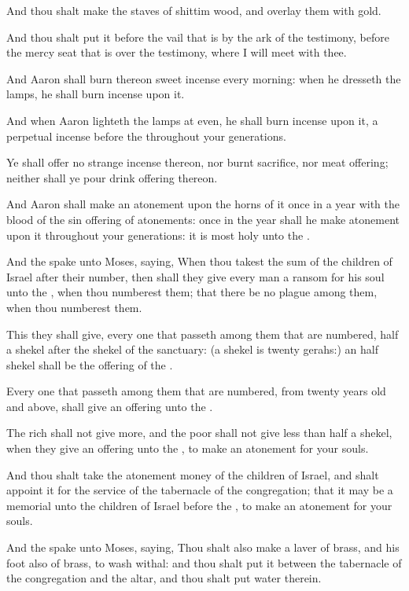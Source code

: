 \verse And thou shalt make the staves of shittim wood, and overlay them
with gold.

\verse And thou shalt put it before the vail that is by the ark of the
testimony, before the mercy seat that is over the testimony, where I
will meet with thee.

\verse And Aaron shall burn thereon sweet incense every morning: when he
dresseth the lamps, he shall burn incense upon it.

\verse And when Aaron lighteth the lamps at even, he shall burn incense
upon it, a perpetual incense before the \LORD throughout your
generations.

\verse Ye shall offer no strange incense thereon, nor burnt sacrifice,
nor meat offering; neither shall ye pour drink offering thereon.

\verse And Aaron shall make an atonement upon the horns of it once in a
year with the blood of the sin offering of atonements: once in the
year shall he make atonement upon it throughout your generations: it
is most holy unto the \LORD.

\verse And the \LORD spake unto Moses, saying, \verse When thou takest
the sum of the children of Israel after their number, then shall they
give every man a ransom for his soul unto the \LORD, when thou
numberest them; that there be no plague among them, when thou
numberest them.

\verse This they shall give, every one that passeth among them that are
numbered, half a shekel after the shekel of the sanctuary: (a shekel
is twenty gerahs:) an half shekel shall be the offering of the \LORD.

\verse Every one that passeth among them that are numbered, from twenty
years old and above, shall give an offering unto the \LORD.

\verse The rich shall not give more, and the poor shall not give less
than half a shekel, when they give an offering unto the \LORD, to make
an atonement for your souls.

\verse And thou shalt take the atonement money of the children of
Israel, and shalt appoint it for the service of the tabernacle of the
congregation; that it may be a memorial unto the children of Israel
before the \LORD, to make an atonement for your souls.

\verse And the \LORD spake unto Moses, saying, \verse Thou shalt also
make a laver of brass, and his foot also of brass, to wash withal: and
thou shalt put it between the tabernacle of the congregation and the
altar, and thou shalt put water therein.


